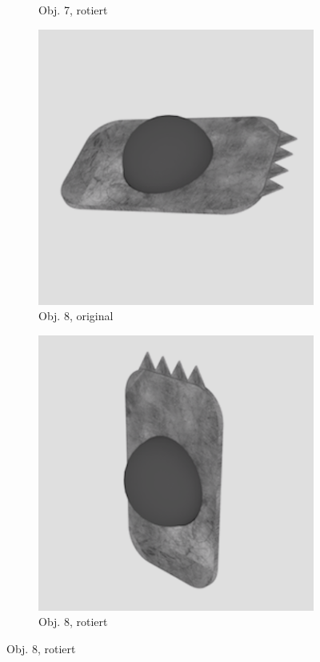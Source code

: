 \begin{figure}
\begin{subfigure}{0.2\textwidth}
\caption{Obj. 7, rotiert} \label{fig:d}
\end{subfigure} \hspace{.5cm}%
\begin{subfigure}{0.2\textwidth}
\includegraphics[width=\linewidth]{Bilder/Objekt8A.png}
\caption{Obj. 8, original} \label{fig:e}
\end{subfigure}\hspace{.5cm}
\begin{subfigure}{0.2\textwidth}
\includegraphics[width=\linewidth]{Bilder/Objekt8B.png}
\caption{Obj. 8, rotiert} \label{fig:f}
\end{subfigure}\hspace{.5cm}


\end{figure}

